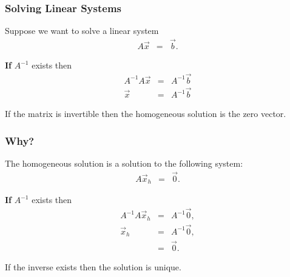 \begin{frame}
  \frametitle{Solving Linear Systems}

  Suppose we want to solve a linear system
  \begin{eqnarray*}
    A \vec{x} & = & \vec{b}.
  \end{eqnarray*}

  \textbf{If} $A^{-1}$ exists then 
  \begin{eqnarray*}
    A^{-1} A \vec{x} & = & A^{-1} \vec{b} \\
    \vec{x} & = & A^{-1} \vec{b}
  \end{eqnarray*}

  If the matrix is invertible then the homogeneous solution is the
  zero vector.

\end{frame}

\begin{frame}
  \frametitle{Why?}

  The homogeneous solution is a solution to the following system:
  \begin{eqnarray*}
    A \vec{x}_h & = & \vec{0}.
  \end{eqnarray*}

  \textbf{If} $A^{-1}$ exists then 
  \begin{eqnarray*}
    A^{-1} A \vec{x}_h & = & A^{-1} \vec{0}, \\
    \vec{x}_h & = & A^{-1} \vec{0}, \\
    & = & \vec{0}.
  \end{eqnarray*}

  If the inverse exists then the solution is unique.

\end{frame}





